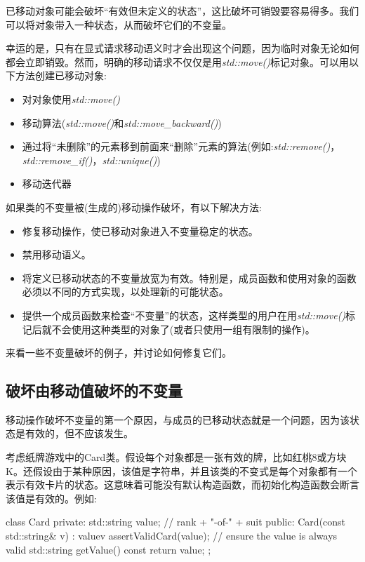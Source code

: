 已移动对象可能会破坏“有效但未定义的状态”，这比破坏可销毁要容易得多。我们可以将对象带入一种状态，从而破坏它们的不变量。

幸运的是，只有在显式请求移动语义时才会出现这个问题，因为临时对象无论如何都会立即销毁。然而，明确的移动请求不仅仅是用\textit{std::move()}标记对象。可以用以下方法创建已移动对象:

\begin{itemize}
	\item 对对象使用\textit{std::move()}
	\item 移动算法(\textit{std::move()}和\textit{std::move_backward()})
	\item 通过将“未删除”的元素移到前面来“删除”元素的算法(例如:\textit{std::remove()}，\textit{std::remove_if()}，\textit{std::unique()})
	\item 移动迭代器
\end{itemize}

如果类的不变量被(生成的)移动操作破坏，有以下解决方法:

\begin{itemize}
	\item 修复移动操作，使已移动对象进入不变量稳定的状态。
	\item 禁用移动语义。
	\item 将定义已移动状态的不变量放宽为有效。特别是，成员函数和使用对象的函数必须以不同的方式实现，以处理新的可能状态。
	\item 提供一个成员函数来检查“不变量”的状态，这样类型的用户在用\textit{std::move()}标记后就不会使用这种类型的对象了(或者只使用一组有限制的操作)。
\end{itemize}

来看一些不变量破坏的例子，并讨论如何修复它们。

\subsection{破坏由移动值破坏的不变量}

移动操作破坏不变量的第一个原因，与成员的已移动状态就是一个问题，因为该状态是有效的，但不应该发生。

考虑纸牌游戏中的Card类。假设每个对象都是一张有效的牌，比如红桃8或方块K。还假设由于某种原因，该值是字符串，并且该类的不变式是每个对象都有一个表示有效卡片的状态。这意味着可能没有默认构造函数，而初始化构造函数会断言该值是有效的。例如:

\begin{cppcode}
class Card {
private:
	std::string value; // rank + "-of-" + suit
public:
	Card(const std::string& v)
	: value{v} {
		assertValidCard(value); // ensure the value is always valid
	}
	std::string getValue() const {
		return value;
	}
};
\end{cppcode}

